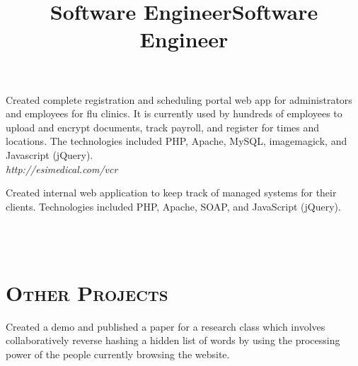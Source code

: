 \begin{resume}
\title{Software Engineer}
\begin{position}
Created complete registration and scheduling portal web app for administrators
and employees for flu clinics. It is currently used by hundreds of employees to
upload and encrypt documents, track payroll, and register for times and
locations. The technologies included PHP, Apache, MySQL, imagemagick, and
Javascript (jQuery).
\\ {\itshape http://esimedical.com/vcr}
\end{position}

\title{Software Engineer}
\begin{position}
Created internal web application to keep track of managed systems for their
clients. Technologies included PHP, Apache, SOAP, and JavaScript (jQuery).
\end{position}



\begin{formatb}
  \\
  \body\\
\end{formatb}

\section{\textsc{Other Projects}}

\begin{position}
Created a demo and published a paper for a research class which involves
collaboratively reverse hashing a hidden list of words by using the processing
power of the people currently browsing the website. \\
\end{position}


\end{resume}
